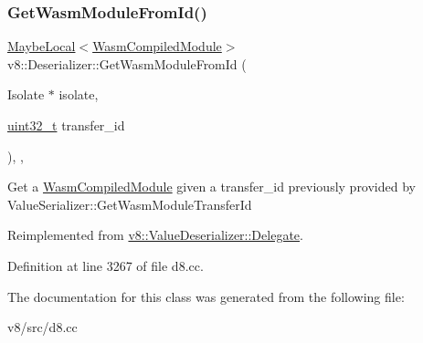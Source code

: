 \subsubsection{\texorpdfstring{Get\+Wasm\+Module\+From\+Id()}{GetWasmModuleFromId()}}
{\footnotesize\ttfamily \mbox{\hyperlink{classv8_1_1MaybeLocal}{Maybe\+Local}}$<$\mbox{\hyperlink{classv8_1_1WasmCompiledModule}{Wasm\+Compiled\+Module}}$>$ v8\+::\+Deserializer\+::\+Get\+Wasm\+Module\+From\+Id (\begin{DoxyParamCaption}\item[{Isolate $\ast$}]{isolate,  }\item[{\mbox{\hyperlink{classuint32__t}{uint32\+\_\+t}}}]{transfer\+\_\+id }\end{DoxyParamCaption})\hspace{0.3cm}{\ttfamily [inline]}, {\ttfamily [override]}, {\ttfamily [virtual]}}

Get a \mbox{\hyperlink{classv8_1_1WasmCompiledModule}{Wasm\+Compiled\+Module}} given a transfer\+\_\+id previously provided by Value\+Serializer\+::\+Get\+Wasm\+Module\+Transfer\+Id 

Reimplemented from \mbox{\hyperlink{classv8_1_1ValueDeserializer_1_1Delegate_a23fc01bc6da1da36bf1d555edd493d83}{v8\+::\+Value\+Deserializer\+::\+Delegate}}.



Definition at line 3267 of file d8.\+cc.



The documentation for this class was generated from the following file\+:\begin{DoxyCompactItemize}
\item 
v8/src/d8.\+cc\end{DoxyCompactItemize}
